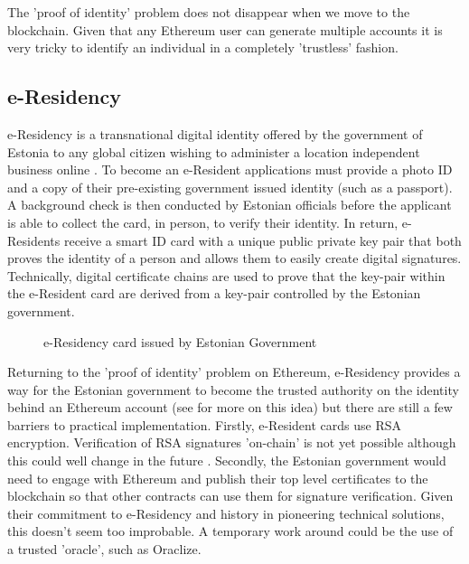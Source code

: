 The 'proof of identity' problem does not disappear when we move to the blockchain. Given that any Ethereum user can generate multiple accounts it is very tricky to identify an individual in a completely 'trustless' fashion. 

\subsection{e-Residency}
e-Residency is a transnational digital identity offered by the government of Estonia to any global citizen wishing to administer a location independent business online \cite{e-Residency}. To become an e-Resident applications must provide a photo ID and a copy of their pre-existing government issued identity (such as a passport). A background check is then conducted by Estonian officials before the applicant is able to collect the card, in person, to verify their identity. In return, e-Residents receive a smart ID card with a unique public private key pair that both proves the identity of a person and allows them to easily create digital signatures. Technically, digital certificate chains are used to prove that the key-pair within the e-Resident card are derived from a key-pair controlled by the Estonian government. \\

\begin{figure}
\centering
{}
\decoRule
\caption[e-Residency Card]{e-Residency card issued by Estonian Government}
\label{fig:e-Residency}
\end{figure}

Returning to the 'proof of identity' problem on Ethereum, e-Residency provides a way for the Estonian government to become the trusted authority on the identity behind an Ethereum account (see \cite{IDBereg} \cite{BertaniKYC} for more on this idea) but there are still a few barriers to practical implementation. Firstly, e-Resident cards use RSA encryption. Verification of RSA signatures 'on-chain' is not yet possible although this could well change in the future \cite{RSARequest}. Secondly, the Estonian government would need to engage with Ethereum and publish their top level certificates to the blockchain so that other contracts can use them for signature verification. Given their commitment to e-Residency and history in pioneering technical solutions\cite{EstoniaE-Voting}, this doesn't seem too improbable. A temporary work around could be the use of a trusted 'oracle'\cite{BertaniOracles}, such as Oraclize\cite{Oraclise}.

